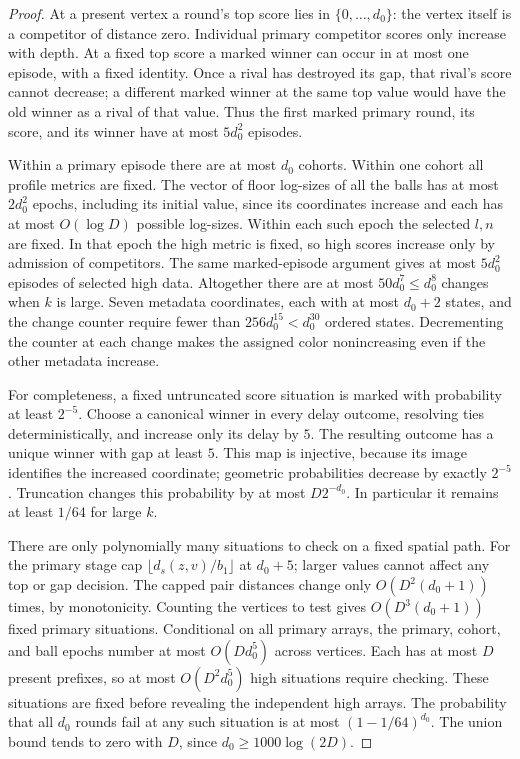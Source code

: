 \begin{proof}
At a present vertex a round's top score lies in $\{0,\ldots,d_0\}$:
the vertex itself is a competitor of distance zero.  Individual primary
competitor scores only increase with depth.  At a fixed top score a
marked winner can occur in at most one episode, with a fixed identity.
Once a rival has destroyed its gap, that rival's score cannot decrease;
a different marked winner at the same top value would have the old
winner as a rival of that value.  Thus the first marked primary round,
its score, and its winner have at most $5d_0^2$ episodes.

Within a primary episode there are at most $d_0$ cohorts.  Within one
cohort all profile metrics are fixed.  The vector of floor log-sizes of all the
balls has at most $2d_0^2$ epochs, including its initial value, since
its coordinates increase and each has at most $O(\log D)$ possible
log-sizes.  Within each such epoch the selected $l,n$ are fixed.  In that epoch the high metric is fixed,
so high scores increase only by admission of competitors.  The same
marked-episode argument gives at most $5d_0^2$ episodes of selected high
data.  Altogether there are at most $50d_0^7\le d_0^8$ changes when
$k$ is large.  Seven metadata coordinates, each with at most $d_0+2$
states, and the change counter require fewer than
$256d_0^{15}<d_0^{30}$ ordered states.  Decrementing the counter at each
change makes the assigned color nonincreasing even if the other
metadata increase.

For completeness, a fixed untruncated score situation is marked with
probability at least $2^{-5}$.  Choose a canonical winner in every delay
outcome, resolving ties deterministically, and increase only its delay
by $5$.  The resulting outcome has a unique winner with gap at least
$5$.  This map is injective, because its image identifies the increased
coordinate; geometric probabilities decrease by exactly $2^{-5}$.
Truncation changes this probability by at most $D2^{-d_0}$.  In
particular it remains at least $1/64$ for large $k$.

There are only polynomially many situations to check on a fixed
spatial path.  For the primary stage cap
$\lfloor d_s(z,v)/b_1\rfloor$ at $d_0+5$; larger values cannot affect
any top or gap decision.  The capped pair distances change only
$O(D^2(d_0+1))$ times, by monotonicity.  Counting the vertices to test
gives $O(D^3(d_0+1))$ fixed primary situations.  Conditional on all
primary arrays, the primary, cohort, and ball epochs number at most
$O(Dd_0^5)$ across vertices.  Each has at most $D$ present prefixes,
so at most $O(D^2d_0^5)$ high situations require checking.  These
situations are fixed before revealing the independent high arrays.
The probability that all $d_0$ rounds fail at any such situation is
at most $(1-1/64)^{d_0}$.  The union bound tends to zero with $D$,
since $d_0\ge1000\log(2D)$.


\end{proof}

